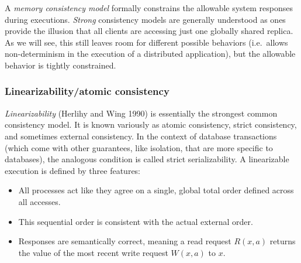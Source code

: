 \documentclass[]             %
{NASA}                       %
\theoremstyle{definition}
\providecommand{\tightlist}{%
  \setlength{\itemsep}{0pt}\setlength{\parskip}{0pt}}
\begin{document}
A \emph{memory consistency model} formally constrains the allowable
system responses during executions. \emph{Strong} consistency models are
generally understood as ones provide the illusion that all clients are
accessing just one globally shared replica. As we will see, this still
leaves room for different possible behaviors (i.e.~allows
non-determinism in the execution of a distributed application), but the
allowable behavior is tightly constrained.

\hypertarget{linearizabilityatomic-consistency}{%
\subsubsection{Linearizability/atomic
consistency}\label{linearizabilityatomic-consistency}}

\emph{Linearizability} (Herlihy and Wing 1990) is essentially the
strongest common consistency model. It is known variously as atomic
consistency, strict consistency, and sometimes external consistency. In
the context of database transactions (which come with other guarantees,
like isolation, that are more specific to databases), the analogous
condition is called strict serializability. A linearizable execution is
defined by three features:

\begin{itemize}
\tightlist
\item
  All processes act like they agree on a single, global total order
  defined across all accesses.
\item
  This sequential order is consistent with the actual external order.
\item
  Responses are semantically correct, meaning a read request \(R(x, a)\)
  returns the value of the most recent write request \(W(x, a)\) to
  \(x\).
\end{itemize}
\end{document}
